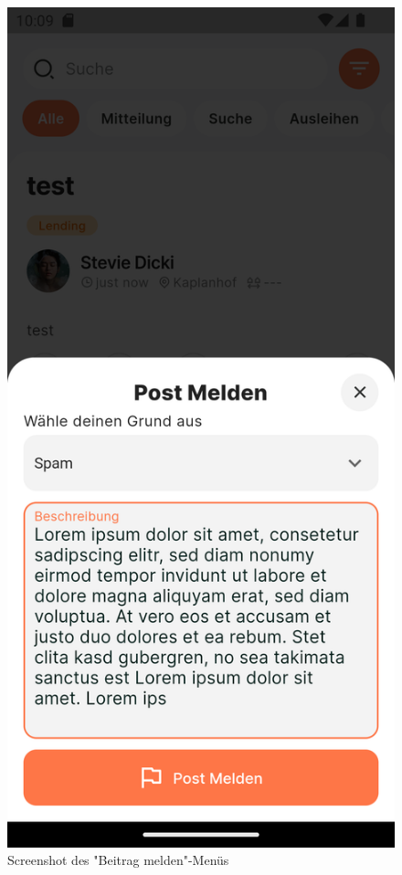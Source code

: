 \begin{figure}[h]
\begin{minipage}[b]{0.3\textwidth}
    \caption{Screenshot des "Mehr"-Menüs für Beiträge}
    \label{fig:post-more-menu}
  \end{minipage}
  \hfill
  \begin{minipage}[b]{0.3\textwidth}
    \includegraphics[width=\textwidth]{pics/post-report-menu.png}
    \caption{Screenshot des "Beitrag melden"-Menüs}
    \label{fig:post-report-menu}
  \end{minipage}
\end{figure}
